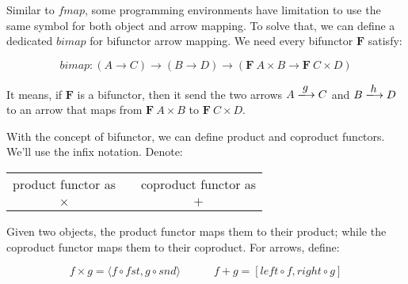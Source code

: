 \documentclass{article}
\begin{document}
Similar to $fmap$, some programming environments have limitation to use the same symbol for both object and arrow mapping. To solve that, we can define a dedicated $bimap$ for bifunctor arrow mapping. We need every bifunctor $\mathbf{F}$ satisfy:

\[
bimap : (A \to C) \to (B \to D) \to (\mathbf{F}\ A \times B \to \mathbf{F}\ C \times D)
\]

It means, if $\mathbf{F}$ is a bifunctor, then it send the two arrows $A \arrowto{g} C$ and $B \arrowto{h} D$ to an arrow that maps from $\mathbf{F}\ A \times B$ to $\mathbf{F}\ C \times D$.

With the concept of bifunctor, we can define product and coproduct functors. We'll use the infix notation. Denote:

\begin{center}
\begin{tabular}{ccc}
 product functor as & \quad \quad \quad & coproduct functor as \\
 $\times$  & \quad \quad \quad & $+$ \\
\end{tabular}
\end{center}

Given two objects, the product functor maps them to their product; while the coproduct functor maps them to their coproduct. For arrows, define:

\[
f \times g = \langle f \circ fst, g \circ snd \rangle
\quad \quad \quad
f + g = [left \circ f, right \circ g]
\]
\end{document}
